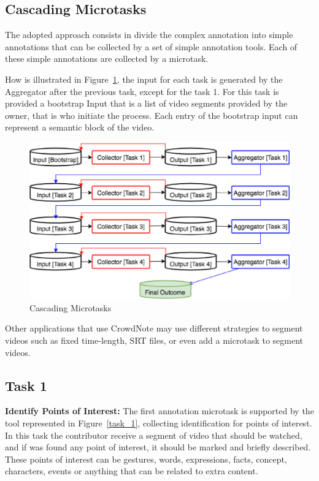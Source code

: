 \subsection{Cascading Microtasks}
The adopted approach consists in divide the complex annotation into simple annotations that can be collected by 
a set of simple annotation tools. Each of these simple annotations are collected by a microtask.

How is illustrated in Figure~\ref{cascading}, the input for each task is generated by the Aggregator after the previous task, except for the task 1. For this task is provided a bootstrap Input that is a list of video segments provided by the owner, that is who initiate the process. Each entry of the bootstrap input can represent a semantic block of the video. 

\begin{figure}[h!]
 \centerline{\includegraphics[scale=0.35] {figure/Cascading}}
	\caption{Cascading Microtasks}
	\label{cascading}
\end{figure}

Other applications that use CrowdNote may use different strategies to segment videos such as fixed time-length, SRT files, or even add a microtask to segment videos.
		


\subsection{Task 1}
\textbf{Identify Points of Interest:} The first annotation microtask is supported by the tool represented in Figure~\ref{task_1}, collecting identification for points of interest. In this task the contributor receive a segment of video that should be watched, and if was found any point of interest, it should be marked and briefly described. These points of interest can be gestures, words, expressions, facts, concept, characters, events or anything that can be related to extra content.

